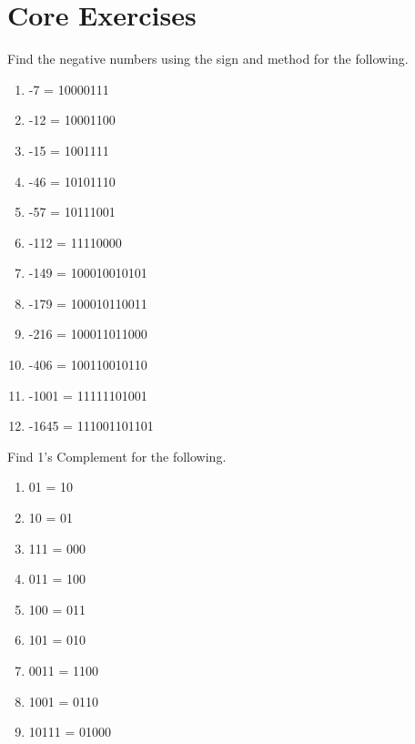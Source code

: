 \section*{Core Exercises}
Find the negative numbers using the sign and method for the following.
\begin{enumerate}[label=(\alph*)]
    \item -7 = 10000111
    \item -12 = 10001100
    \item -15 = 1001111
    \item -46 = 10101110
    \item -57 = 10111001
    \item -112 = 11110000
    \item -149 = 100010010101
    \item -179 = 100010110011
    \item -216 = 100011011000
    \item -406 = 100110010110
    \item -1001 = 11111101001
    \item -1645 = 111001101101
\end{enumerate}

Find 1's Complement for the following.
\begin{enumerate}[label=(\alph*)]
    \item 01 = 10
    \item 10 = 01
    \item 111 = 000
    \item 011 = 100
    \item 100 = 011
    \item 101 = 010
    \item 0011 = 1100
    \item 1001 = 0110
    \item 10111 = 01000
\end{enumerate}

